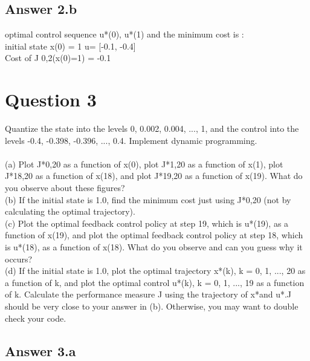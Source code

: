 \documentclass[12pt]{article}
\begin{document}
\subsection*{Answer 2.b}

{
optimal control sequence u*(0), u*(1) and the minimum cost is : \\ 
initial state x(0) = 1   u= [-0.1, -0.4]\\
Cost of J 0,2(x(0)=1) = -0.1

}




\section*{Question 3}

{
Quantize the state into the levels 0, 0.002, 0.004, ..., 1, and the control into the levels -0.4,
-0.398, -0.396, ..., 0.4. Implement dynamic programming.\\ \\
(a) Plot J*0,20 as a function of x(0), plot J*1,20 as a function of x(1), plot J*18,20
as a function of x(18), and plot J*19,20 as a function of x(19). What do you observe about these figures?\\
(b) If the initial state is 1.0, find the minimum cost just using J*0,20 (not by calculating the optimal trajectory).\\
(c) Plot the optimal feedback control policy at step 19, which is u*(19), as a function of x(19), and plot the optimal feedback control policy at step 18, which is u*(18), as a function of x(18). What do you observe and can you guess why it occurs?\\
(d) If the initial state is 1.0, plot the optimal trajectory x*(k), k = 0, 1, ..., 20 as a function
of k, and plot the optimal control u*(k), k = 0, 1, ..., 19 as a function of k. Calculate the
performance measure J using the trajectory of x*and u*.J should be very close to your answer in (b). Otherwise, you may want to double check your code.\\


}



\subsection*{Answer 3.a}
\end{document}
